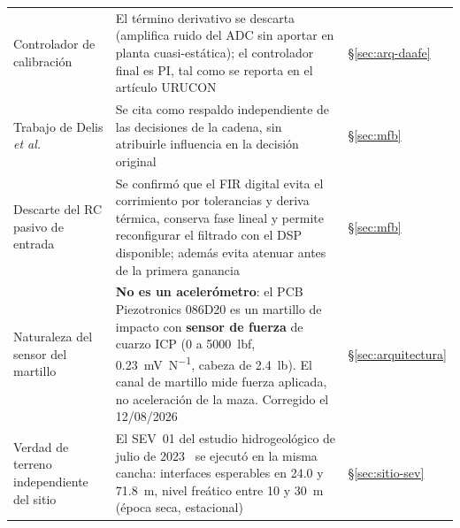 \begin{center}
\begin{tabularx}{\textwidth}{@{}l X l@{}}
\addlinespace[2pt]
Controlador de calibraci\'on
& El t\'ermino derivativo se descarta (amplifica ruido del ADC sin aportar en planta cuasi-est\'atica); el controlador final es PI, tal como se reporta en el art\'iculo URUCON
& \S\ref{sec:arq-daafe} \\
\addlinespace[2pt]
Trabajo de Delis \emph{et al.}~\cite{Delis2025}
& Se cita como respaldo independiente de las decisiones de la cadena, sin atribuirle influencia en la decisi\'on original
& \S\ref{sec:mfb} \\
\addlinespace[2pt]
Descarte del RC pasivo de entrada
& Se confirm\'o que el FIR digital evita el corrimiento por tolerancias y deriva t\'ermica, conserva fase lineal y permite reconfigurar el filtrado con el DSP disponible; adem\'as evita atenuar antes de la primera ganancia
& \S\ref{sec:mfb} \\
\addlinespace[2pt]
Naturaleza del sensor del martillo
& \textbf{No es un aceler\'ometro}: el PCB Piezotronics 086D20 es un martillo de impacto con \textbf{sensor de fuerza} de cuarzo ICP (0 a \num{5000}~lbf, \SI{0.23}{\milli\volt\per\newton}, cabeza de \num{2.4}~lb). El canal de martillo mide fuerza aplicada, no aceleraci\'on de la maza. Corregido el 12/08/2026
& \S\ref{sec:arquitectura} \\
\addlinespace[2pt]
Verdad de terreno independiente del sitio
& El SEV~01 del estudio hidrogeol\'ogico de julio de 2023~\cite{GonzalezHidro2023} se ejecut\'o en la misma cancha: interfaces esperables en \SI{24.0}{} y \SI{71.8}{\meter}, nivel fre\'atico entre \SI{10}{} y \SI{30}{\meter} (\'epoca seca, estacional)
& \S\ref{sec:sitio-sev} \\
\bottomrule
\end{tabularx}
\end{center}
